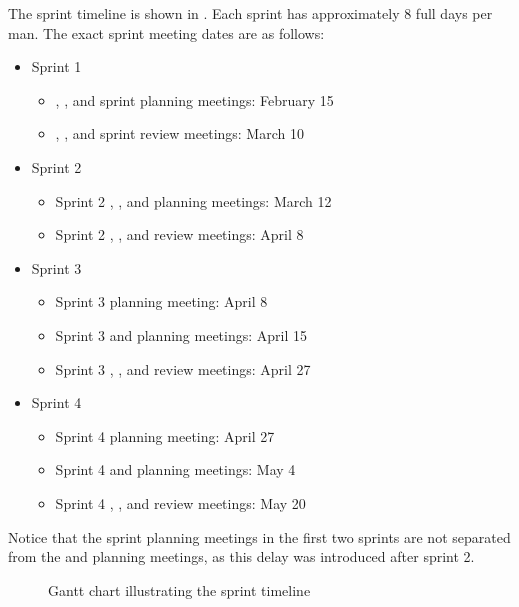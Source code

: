 The sprint timeline is shown in . Each sprint has approximately 8 full days per man. The exact sprint meeting dates are as follows:
\begin{itemize}
  \item Sprint 1
  \begin{itemize}
    \item \gui{}, \db{}, and \bd{} sprint planning meetings: February 15
    \item \gui{}, \db{}, and \bd{} sprint review meetings: March 10
  \end{itemize}
  \item Sprint 2
  \begin{itemize}
    \item Sprint 2 \gui{}, \db{}, and \bd{} planning meetings: March 12
    \item Sprint 2 \gui{}, \db{}, and \bd{} review meetings: April 8
  \end{itemize}
  \item Sprint 3
  \begin{itemize}
    \item Sprint 3 \gui{} planning meeting: April 8
    \item Sprint 3 \db{} and \bd{} planning meetings: April 15
    \item Sprint 3 \gui{}, \db{}, and \bd{} review meetings: April 27
  \end{itemize}
  \item Sprint 4
  \begin{itemize}
    \item Sprint 4 \gui{} planning meeting: April 27
    \item Sprint 4 \db{} and \bd{} planning meetings: May 4
    \item Sprint 4 \gui{}, \db{}, and \bd{} review meetings: May 20
  \end{itemize}
\end{itemize}
Notice that the \gui{} sprint planning meetings in the first two sprints are not separated from the \db{} and \bd{} planning meetings, as this delay was introduced after sprint 2.

\begin{figure}[ht]
  \centering
  \caption{\label{fig:gantt_dates} Gantt chart illustrating the sprint timeline}
\end{figure}

